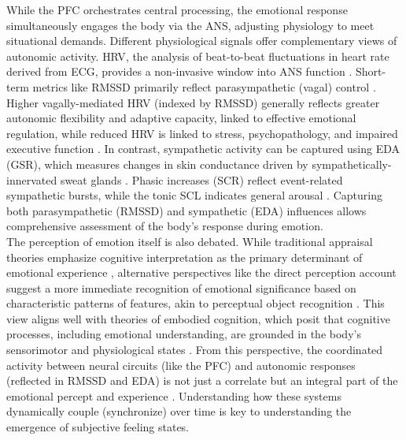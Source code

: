 \documentclass[12pt]{article} %
\begin{document}
While the \gls{PFC} orchestrates central processing, the emotional response simultaneously engages the body via the \gls{ANS}, adjusting physiology to meet situational demands. Different physiological signals offer complementary views of autonomic activity. \gls{HRV}, the analysis of beat-to-beat fluctuations in heart rate derived from \gls{ECG}, provides a non-invasive window into \gls{ANS} function \parencite{malikHeartRateVariability1996, berntsonHeartRateVariability1997}. Short-term metrics like \gls{RMSSD} primarily reflect parasympathetic (vagal) control \parencite{malikHeartRateVariability1996, shafferOverviewHeartRate2017}. Higher vagally-mediated \gls{HRV} (indexed by \gls{RMSSD}) generally reflects greater autonomic flexibility and adaptive capacity, linked to effective emotional regulation, while reduced \gls{HRV} is linked to stress, psychopathology, and impaired executive function \parencite{thayerRelationshipAutonomicImbalance2010}. In contrast, sympathetic activity can be captured using \gls{EDA} (\gls{GSR}), which measures changes in skin conductance driven by sympathetically-innervated sweat glands \parencite{dawsonElectrodermalSystem2007, boucseinElectrodermalActivity2012}. Phasic increases (\gls{SCR}) reflect event-related sympathetic bursts, while the tonic \gls{SCL} indicates general arousal \parencite{boucseinElectrodermalActivity2012}. Capturing both parasympathetic (\gls{RMSSD}) and sympathetic (\gls{EDA}) influences allows comprehensive assessment of the body's response during emotion.\\

The perception of emotion itself is also debated. While traditional appraisal theories emphasize cognitive interpretation as the primary determinant of emotional experience \parencite{schererAppraisalProcessesEmotion2001}, alternative perspectives like the direct perception account suggest a more immediate recognition of emotional significance based on characteristic patterns of features, akin to perceptual object recognition \parencite{newenEmotionRecognitionPattern2015}. This view aligns well with theories of embodied cognition, which posit that cognitive processes, including emotional understanding, are grounded in the body's sensorimotor and physiological states \parencite{niedenthalEmbodimentEmotionConcepts2009}. From this perspective, the coordinated activity between neural circuits (like the \gls{PFC}) and autonomic responses (reflected in \gls{RMSSD} and \gls{EDA}) is not just a correlate but an integral part of the emotional percept and experience \parencite{critchleyNeuralMechanismsAutonomic2005}. Understanding how these systems dynamically couple (synchronize) over time is key to understanding the emergence of subjective feeling states. \\
\end{document}

